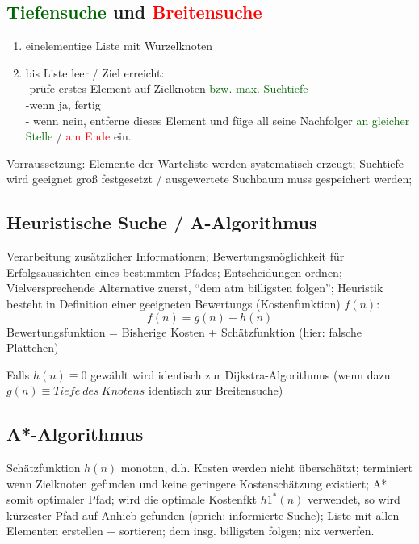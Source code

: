 \documentclass[german,color,6pt]{latex4ei/latex4ei_sheet}
\begin{document}
\begin{sectionbox}
\subsection{\textcolor{darkgreen}{Tiefensuche} und \textcolor{red}{Breitensuche}}
\begin{enumerate}
	\item einelementige Liste mit Wurzelknoten
	\item bis Liste leer / Ziel erreicht: \\ -prüfe erstes Element auf Zielknoten \textcolor{darkgreen}{bzw. max. Suchtiefe} \\-wenn ja, fertig \\ - wenn nein, entferne dieses Element und füge all seine Nachfolger \textcolor{darkgreen}{ an gleicher Stelle} / \textcolor{red}{am Ende} ein.
\end{enumerate}

Vorraussetzung: Elemente der Warteliste werden systematisch erzeugt; Suchtiefe wird geeignet groß festgesetzt / ausgewertete Suchbaum muss gespeichert werden;
\end{sectionbox}

\begin{sectionbox}
\subsection{Heuristische Suche / A-Algorithmus}
Verarbeitung zusätzlicher Informationen; Bewertungsmöglichkeit für Erfolgsaussichten eines bestimmten Pfades; Entscheidungen ordnen; Vielversprechende Alternative zuerst, "`dem atm billigsten folgen"'; Heuristik besteht in Definition einer geeigneten Bewertungs (Kostenfunktion) $f(n)$:
\begin{equation*}
f(n) = g(n) + h(n)
\end{equation*}
Bewertungsfunktion = Bisherige Kosten + Schätzfunktion (hier: falsche Plättchen)

Falls $h(n) \equiv 0$ gewählt wird identisch zur Dijkstra-Algorithmus (wenn dazu $g(n) \equiv Tiefe\:des\:Knotens$ identisch zur Breitensuche)
\end{sectionbox}

\begin{sectionbox}
\subsection{A*-Algorithmus}
Schätzfunktion $h(n)$ monoton, d.h. Kosten werden nicht überschätzt; terminiert wenn Zielknoten gefunden und keine geringere Kostenschätzung existiert; A* somit optimaler Pfad; wird die optimale Kostenfkt $h1^*(n)$ verwendet, so wird kürzester Pfad auf Anhieb gefunden (sprich: informierte Suche); Liste mit allen Elementen erstellen + sortieren; dem insg. billigsten folgen; nix verwerfen.
\end{sectionbox}
\end{document}
